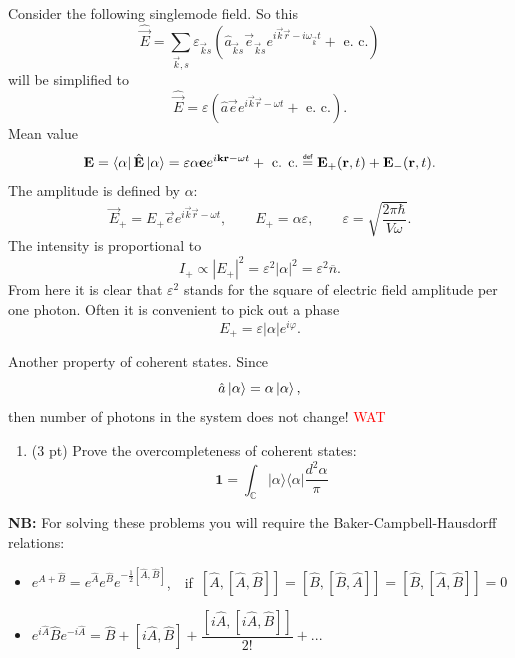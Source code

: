 Consider the following singlemode field. So this
\begin{equation}
	\hat{\vec{E}} = \sum_{\vec{k},s} \varepsilon_{\vec{k}s} \left( \hat{a}_{\vec{k}s} \vec{e}_{\vec{k}s} e^{i \vec{k} \vec{r} - i \omega_{\vec{k}}t} + \text{ e. c.} \right)
\end{equation}
will be simplified to
\begin{equation}
	\hat{\vec{E}} = \varepsilon \left( \hat{a} \vec{e} e^{i \vec{k} \vec{r} - \omega t} + \text{ e. c.}\right).
\end{equation}
Mean value
\begin{equation}
	\vec{E} = \bra{\alpha} \hat{\vec{E}} \ket{\alpha} = \varepsilon \alpha \vec{e} e^{i \vec{k} \vec{r} - \omega t} + \text{ c. c.} \myeq \vec{E}_+(\vec{r},t) + \vec{E}_-(\vec{r},t).
\end{equation}
The amplitude is defined by $\alpha$:
\begin{equation}
	\vec{E}_+ = E_+ \vec{e} e^{i \vec{k} \vec{r} - \omega t}, \qquad E_+ = \alpha \varepsilon, \qquad \varepsilon = \sqrt{\frac{2 \pi \hbar}{V \omega}}.
\end{equation}
The intensity is proportional to
\begin{equation}
	I_+ \propto \left|E_+\right|^2 = \varepsilon^2 \left|\alpha\right|^2 = \varepsilon^2 \overline{n}.
\end{equation}
From here it is clear that $\varepsilon^2$ stands for the square of electric field amplitude per one photon. Often it is convenient to pick out a phase
\begin{equation}
	E_+ = \varepsilon \left|\alpha\right| e^{i \varphi}.
\end{equation}

Another property of coherent states. Since
\begin{equation}
	\hat{a} \left\lvert {\alpha} \right\rangle = \alpha \left\lvert {\alpha} \right\rangle,
\end{equation}
then number of photons in the system does not change! {\textcolor{red}{WAT}}


\begin{hw}
	
	\begin{enumerate}
	\item (3 pt) Prove the overcompleteness of coherent states:
	$$
	\mathbf{1}=\int_\mathbb{ C} |\alpha\rangle \langle \alpha| \frac{d^{2}\alpha}{\pi}
	$$
	\end{enumerate}


	{\bf NB:} For solving these problems  you will require the Baker-Campbell-Hausdorff  relations:
	\begin{itemize}
	\item $e^{\hat A+\hat B}=e^{\hat A}e^{\hat B}e^{-\frac{1}{2}[\hat A, \hat B]}$,\ \  if\  $[\hat A,[\hat A,\hat B]]=[\hat B,[\hat B,\hat A]]=[\hat B,[\hat A,\hat B]]=0$
	\item $e^{i\hat A}\hat Be^{-i\hat A} = \hat B + [i\hat A,\hat B] + \dfrac{[i\hat A,[i\hat A,\hat B]]}{2!} + ...$
	\end{itemize}

\end{hw}



